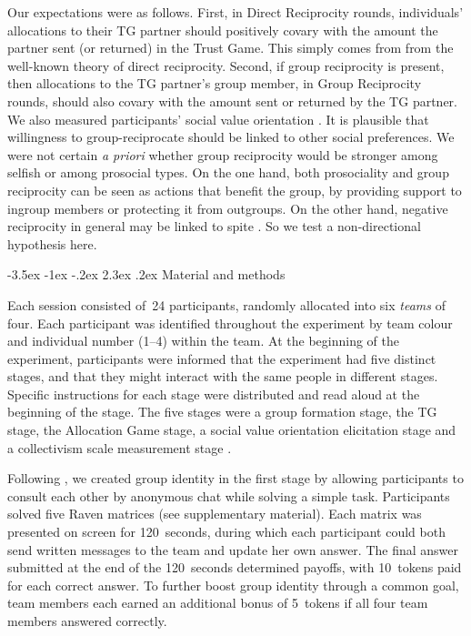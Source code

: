 \documentclass[12pt,a4paper]{article}\usepackage[]{graphicx}\usepackage[]{color}
\makeatletter
\renewcommand\section{\@startsection {section}{1}{\z@}%
{-3.5ex \@plus -1ex \@minus -.2ex}%
{2.3ex \@plus.2ex}%
{\bf\sffamily\Large}}
\makeatother
\begin{document}
Our expectations were as follows. First, in Direct Reciprocity rounds, individuals' allocations to their TG partner
should positively covary with the amount the partner sent (or returned) in the Trust Game. This simply comes from
from the well-known theory of direct reciprocity. Second, if group reciprocity is present, then allocations to the TG partner's group member, in Group Reciprocity rounds, should also covary with the amount sent or returned by the TG partner.
We also measured participants' social value orientation \citep{van1999pursuit}. It is plausible that willingness to group-reciprocate should
be linked to other social preferences. We were not certain \emph{a priori} whether group reciprocity would be stronger
among selfish or among prosocial types. On the one hand, both prosociality and group reciprocity can be seen as actions
that benefit the group, by providing support to ingroup members or protecting it from outgroups. On the other hand,
negative reciprocity in general may be linked to spite \citep{johnstone2004evolution}. So we test a non-directional hypothesis here.

\section{Material and methods}
\label{sec:design}

Each session consisted of~24 participants, randomly allocated into six
\emph{teams} of four. Each participant was identified throughout the experiment
by team colour and individual number (1--4) within the team. At the beginning of
the experiment, participants were informed that the experiment had five distinct
stages, and that they might interact with the same people in different stages.
Specific instructions for each stage were distributed and read aloud at the
beginning of the stage. The five stages were a group formation stage, the TG
stage, the Allocation Game stage, a social value orientation elicitation stage
\citep*{murphy2011measuring} and a collectivism scale measurement stage
\citep*[adapted from the horizontal collectivism scale
in][]{Singelis1995horizontal}.

Following \citep{chen2009group}, we created group identity in the
first stage by allowing participants to consult each other by anonymous
chat while solving a simple task. Participants solved five Raven matrices
(see supplementary material). Each matrix was presented on screen
for 120~seconds, during which each participant could both send written
messages to the team and update her own answer. The final answer submitted
at the end of the 120~seconds determined payoffs, with 10~tokens
paid for each correct answer. To further boost group identity through
a common goal, team members each earned an additional bonus of 5~tokens
if all four team members answered correctly.
\end{document}
